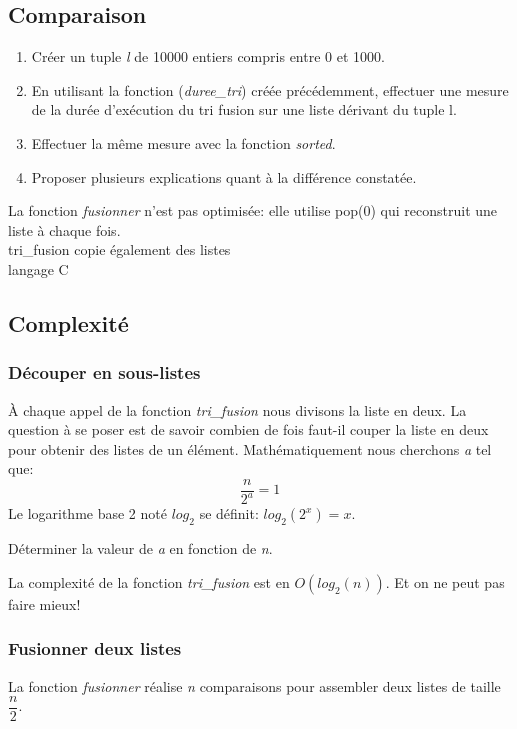 \documentclass[a4paper,11pt]{article}
\begin{document}
\begin{Form}
\subsection{Comparaison}
\begin{activite}
\begin{enumerate}
\item Créer un tuple \emph{l} de 10000 entiers compris entre 0 et 1000.
\item En utilisant la fonction (\emph{duree\_tri}) créée précédemment, effectuer une mesure de la durée d'exécution du tri fusion sur une liste dérivant du tuple l.
\item Effectuer la même mesure avec la fonction \emph{sorted}.
\item Proposer plusieurs explications quant à la différence constatée.
\end{enumerate}
\end{activite}
\begin{commentprof}
La fonction \emph{fusionner} n'est pas optimisée: elle utilise pop(0) qui reconstruit une liste à chaque fois.\\
tri\_fusion copie également des listes\\
langage C
\end{commentprof}
\subsection{Complexité}
\subsubsection{Découper en sous-listes}
À chaque appel de la fonction \emph{tri\_fusion} nous divisons la liste en deux. La question à se poser est de savoir combien de fois faut-il couper la liste en deux pour obtenir des listes de un élément. Mathématiquement nous cherchons \emph{a} tel que: $$\dfrac{n}{2^a}=1$$
Le logarithme base 2 noté $log_2$ se définit: $log_2(2^x)=x$.
\begin{activite}
Déterminer la valeur de \emph{a} en fonction de \emph{n}.
\end{activite}
\begin{commentprof}
La complexité de la fonction \emph{tri\_fusion} est en $O(log_2(n))$. Et on ne peut pas faire mieux!
\end{commentprof}
\subsubsection{Fusionner deux listes}
La fonction \emph{fusionner} réalise \emph{n} comparaisons pour assembler deux listes de taille $\dfrac{n}{2}$.
\begin{figure}[!h]
\centering
{}
\end{figure}
\end{Form}
\end{document}
